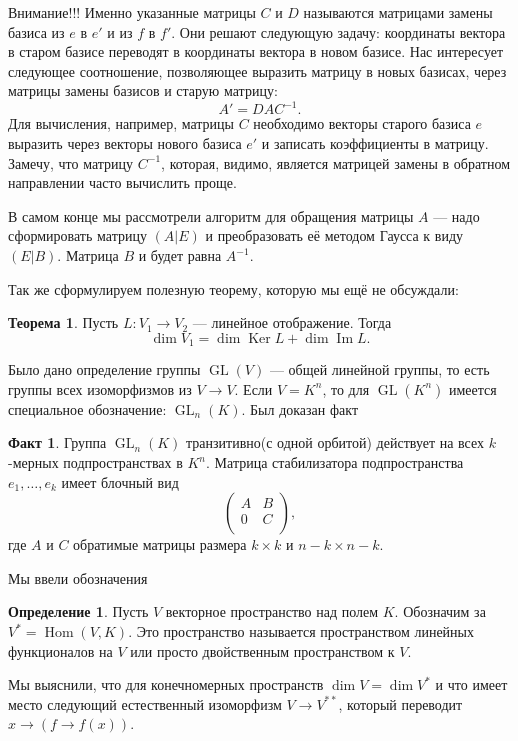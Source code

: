 \documentclass[10pt,a4paper,oneside]{book}
\theoremstyle{definition}
\newtheorem{defn}{Определение}
\newtheorem*{fact}{Факт}
\newtheorem{thm}{Теорема}
\DeclareMathOperator{\Ker}{Ker}
\newcommand{\im}{\operatorname{Im}}
\newcommand{\Hom}{\operatorname{Hom}}
\newcommand{\GL}{\operatorname{GL}}
\begin{document}
{\color{red} Внимание!!!} Именно указанные матрицы $C$ и $D$ называются матрицами замены базиса из $e$ в $e'$ и из $f$ в $f'$. Они решают следующую задачу: координаты вектора в старом базисе переводят в координаты вектора в новом базисе.
Нас интересует следующее соотношение, позволяющее выразить матрицу в новых базисах, через матрицы замены базисов и старую матрицу:
$$A'=DAC^{-1}.$$
Для вычисления, например, матрицы $C$ необходимо векторы старого базиса $e$ выразить через векторы нового базиса $e'$ и записать коэффициенты в матрицу. Замечу, что матрицу $C^{-1}$, которая, видимо, является матрицей замены в обратном направлении часто вычислить проще. 


В самом конце мы рассмотрели алгоритм для обращения матрицы $A$ --- надо сформировать матрицу $(A|E)$ и преобразовать её методом Гаусса к виду $(E|B)$. Матрица $B$ и будет равна $A^{-1}$.


Так же сформулируем полезную теорему, которую мы ещё не обсуждали:
\begin{thm}
Пусть $L\colon V_1 \to V_2$ --- линейное отображение. Тогда 
$$\dim V_1= \dim \Ker L +  \dim \im L.$$
\end{thm}


Было дано определение группы $\GL(V)$ --- общей линейной группы, то есть группы всех изоморфизмов из $V\to V$. Если $V=K^n$, то для $\GL(K^n)$ имеется специальное обозначение: $\GL_n(K)$. Был доказан факт

\begin{fact}
Группа $\GL_n(K)$ транзитивно(с одной орбитой) действует на всех $k$-мерных подпространствах в $K^n$. Матрица стабилизатора подпространства $e_1,\dots, e_k$ имеет блочный вид
$$\left(\begin{matrix}A & B\\
0 & C \\
\end{matrix}\right),$$
где $A$ и $C$ обратимые матрицы размера $k\times k$ и $n-k\times n-k$.
\end{fact}


Мы ввели обозначения 

\begin{defn} Пусть $V$ векторное пространство над полем $K$. Обозначим за $V^{*}=\Hom(V,K)$. Это пространство называется пространством линейных функционалов на $V$ или просто двойственным пространством к $V$. 
\end{defn}

Мы выяснили, что для конечномерных пространств $\dim V = \dim V^{*} $ и что имеет место следующий естественный изоморфизм $V \to V^{**} $, который переводит $x \to (f\to f(x))$.
\end{document}
